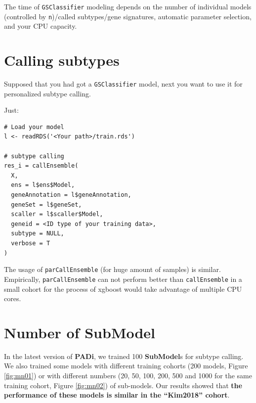 \documentclass[
  12pt,
]{book}
\newcommand{\passthrough}[1]{#1}
\begin{document}
The time of \passthrough{\lstinline!GSClassifier!} modeling depends on the number of individual models (controlled by \passthrough{\lstinline!n!})/called subtypes/gene signatures, automatic parameter selection, and your CPU capacity.

\hypertarget{calling-subtypes}{%
\section{Calling subtypes}\label{calling-subtypes}}

Supposed that you had got a \passthrough{\lstinline!GSClassifier!} model, next you want to use it for personalized subtype calling.

Just:

\begin{lstlisting}
# Load your model
l <- readRDS('<Your path>/train.rds')

# subtype calling
res_i = callEnsemble(
  X,
  ens = l$ens$Model,
  geneAnnotation = l$geneAnnotation,
  geneSet = l$geneSet,
  scaller = l$scaller$Model,
  geneid = <ID type of your training data>,
  subtype = NULL,
  verbose = T
)
\end{lstlisting}

The usage of \passthrough{\lstinline!parCallEnsemble!} (for huge amount of samples) is similar. Empirically, \passthrough{\lstinline!parCallEnsemble!} can not perform better than \passthrough{\lstinline!callEnsemble!} in a small cohort for the process of xgboost would take advantage of multiple CPU cores.

\hypertarget{topicSubmodel}{%
\section{Number of SubModel}\label{topicSubmodel}}

In the latest version of \textbf{PADi}, we trained 100 \textbf{SubModel}s for subtype calling. We also trained some models with different training cohorts (200 models, Figure \ref{fig:mn01}) or with different numbers (20, 50, 100, 200, 500 and 1000 for the same training cohort, Figure \ref{fig:mn02}) of sub-models. Our results showed that \textbf{the performance of these models is similar in the ``Kim2018'' cohort}.
\end{document}
